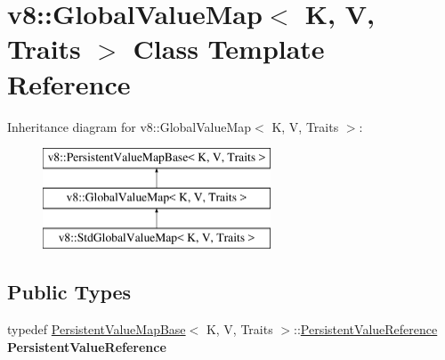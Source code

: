 \hypertarget{classv8_1_1GlobalValueMap}{}\section{v8\+:\+:Global\+Value\+Map$<$ K, V, Traits $>$ Class Template Reference}
\label{classv8_1_1GlobalValueMap}
Inheritance diagram for v8\+:\+:Global\+Value\+Map$<$ K, V, Traits $>$\+:\begin{figure}[H]
\begin{center}
\leavevmode
\includegraphics[height=3.000000cm]{classv8_1_1GlobalValueMap}
\end{center}
\end{figure}
\subsection*{Public Types}
\begin{DoxyCompactItemize}
\item 
\mbox{\label{classv8_1_1GlobalValueMap_ac01835ce1863e1c577882e31b60efc35}} 
typedef \mbox{\hyperlink{classv8_1_1PersistentValueMapBase}{Persistent\+Value\+Map\+Base}}$<$ K, V, Traits $>$\+::\mbox{\hyperlink{classv8_1_1PersistentValueMapBase_1_1PersistentValueReference}{Persistent\+Value\+Reference}} {\bfseries Persistent\+Value\+Reference}
\end{DoxyCompactItemize}
